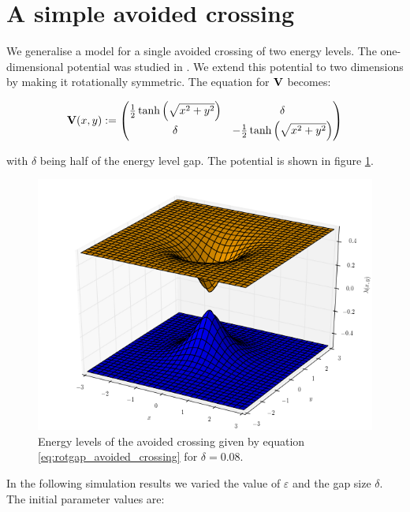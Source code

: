 \FloatBarrier
\section{A simple avoided crossing}

We generalise a model for a single avoided crossing of two energy levels.
The one-dimensional potential was studied in \cite{FGL_semiclassical_dynamics, B_bachelor_thesis}.
We extend this potential to two dimensions by making it rotationally symmetric. The equation
for $\mathbf{V}$ becomes:

\begin{equation} \label{eq:rotgap_avoided_crossing}
  \mathbf{V}(x,y) :=
  \begin{pmatrix}
    \frac{1}{2} \tanh{\left(\sqrt{x^2 + y^2} \right)} & \delta \\
    \delta                                            & - \frac{1}{2} \tanh{\left(\sqrt{x^2 + y^2}\right)}
  \end{pmatrix}
\end{equation}

with $\delta$ being half of the energy level gap. The potential is shown in figure \ref{fig:rotgap_avoided_crossing}.

\begin{figure}[ht!]
  \centering
  \includegraphics[width=0.7\linewidth]{./fig/delta_gap_rotsym.png}
  \caption{Energy levels of the avoided crossing given by equation \eqref{eq:rotgap_avoided_crossing}
          for $\delta = 0.08$.}
  \label{fig:rotgap_avoided_crossing}
\end{figure}

In the following simulation results we varied the value of $\varepsilon$ and the gap size $\delta$.
The initial parameter values are:

